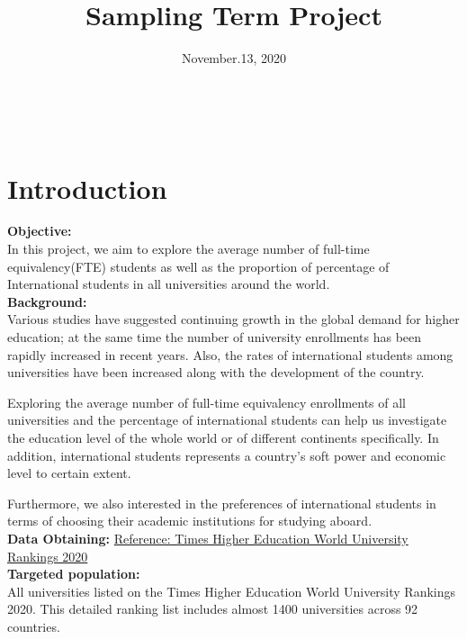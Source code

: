 \documentclass{article}
\begin{document}
\title{\textbf{Sampling Term Project}}\\
\date{November.13, 2020} 



\maketitle
\newpage
\section{Introduction}
\textbf{Objective:} \\

In this project, we aim to explore the average number of full-time equivalency(FTE) students as well as the proportion of percentage of International students in all universities around the world. \\

\noindent\textbf{Background:} \\

Various studies have suggested continuing growth in the global demand for higher education; at the same time the number of university enrollments has been rapidly increased in recent years. Also, the rates of international students among universities have been increased along with the development of the country. 

Exploring the average number of full-time equivalency enrollments of all universities and the percentage of international students can help us investigate the education level of the whole world or of different continents specifically. In addition, international students represents a country’s soft power and economic level to certain extent. 

Furthermore, we also interested in the preferences of international students in terms of choosing their academic institutions for studying aboard. \\

\noindent\textbf {Data Obtaining:} 
\href{https://www.timeshighereducation.com/world-university-rankings/2020/world-ranking#!/page/0/length/25/sort_by/rank/sort_order/asc/cols/stats}{Reference: Times Higher Education World University Rankings 2020} \\

\noindent\textbf {Targeted population:} \\

All universities listed on the Times Higher Education World University Rankings 2020. This detailed ranking list includes almost 1400 universities across 92 countries.  \\
\end{document}
